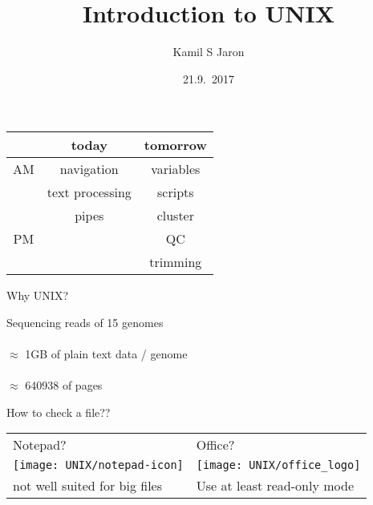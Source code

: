 \documentclass[xcolor=dvipsnames]{beamer}
\title[ ]{Introduction to UNIX}
\author{Kamil S Jaron}
\date{21.9.~2017}
\begin{document}
\Large
\begin{frame}
	\titlepage
\end{frame}

\begin{frame}
	\huge
	\begin{center}
		\begin{tabular}{c | c | c}
		 & today & tomorrow \\
		 \hline
		AM & navigation & variables \\
		 & text processing & scripts \\
		 & pipes & cluster \\
		 \hline
		 PM &  & QC \\
		 & & trimming \\
		\end{tabular}
	\end{center}
\end{frame}

\begin{frame}
	\Huge
	\begin{center}
		Why UNIX?
	\end{center}
\end{frame}

\begin{frame}
	\huge
	\begin{center}
	Sequencing reads of 15 genomes \\
	~\\
	$\approx$ 1GB of plain text data / genome \\
	~\\
	$\approx$ 640938 of pages
	\end{center}
\end{frame}

\begin{frame}
	\begin{center}
	\huge
	How to check a file?? \\
	\vspace{1cm}

	\Large
	\begin{tabular}{C{0.4\textwidth}C{0.4\textwidth}}
	Notepad? & Office? \\
	\texttt{[image: UNIX/notepad-icon]} & \texttt{[image: UNIX/office\_logo]} \\
	\small not well suited for big files & \small Use at least read-only mode\\
	\end{tabular}
	\end{center}
\end{frame}
\end{document}
